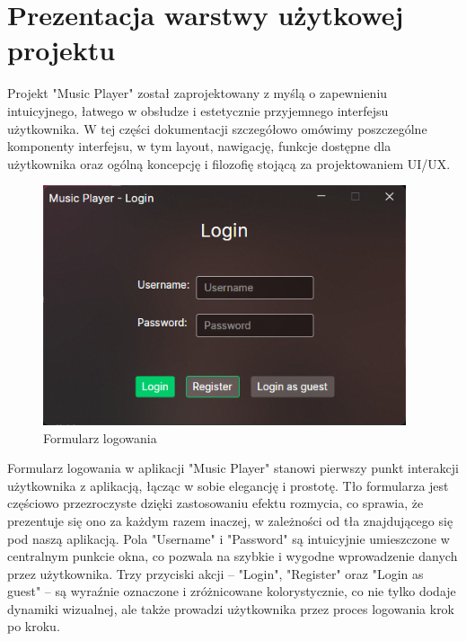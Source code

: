 ﻿%
\chapter{Prezentacja warstwy użytkowej projektu}

Projekt "Music Player" został zaprojektowany z myślą o zapewnieniu intuicyjnego, łatwego w obsłudze i estetycznie przyjemnego interfejsu użytkownika. W tej części dokumentacji szczegółowo omówimy poszczególne komponenty interfejsu, w tym layout, nawigację, funkcje dostępne dla użytkownika oraz ogólną koncepcję i filozofię stojącą za projektowaniem UI/UX. 


\begin{figure}[!ht]
	\begin{center}
	\includegraphics[height=200pt]{figures/login.png}
        \caption{{\footnotesize Formularz logowania}}
	\end{center}
\end{figure}

{Formularz logowania w aplikacji "Music Player" stanowi pierwszy punkt interakcji użytkownika z aplikacją, łącząc w sobie elegancję i prostotę. 
Tło formularza jest częściowo przezroczyste dzięki zastosowaniu efektu rozmycia, co sprawia, że prezentuje się ono za każdym razem inaczej, w zależności od tła znajdującego się pod naszą aplikacją. Pola "Username" i "Password" są intuicyjnie umieszczone w centralnym punkcie okna, co pozwala na szybkie i wygodne wprowadzenie danych przez użytkownika. Trzy przyciski akcji – "Login", "Register" oraz "Login as guest" – są wyraźnie oznaczone i zróżnicowane kolorystycznie, co nie tylko dodaje dynamiki wizualnej, ale także prowadzi użytkownika przez proces logowania krok po kroku.
}
\newpage

